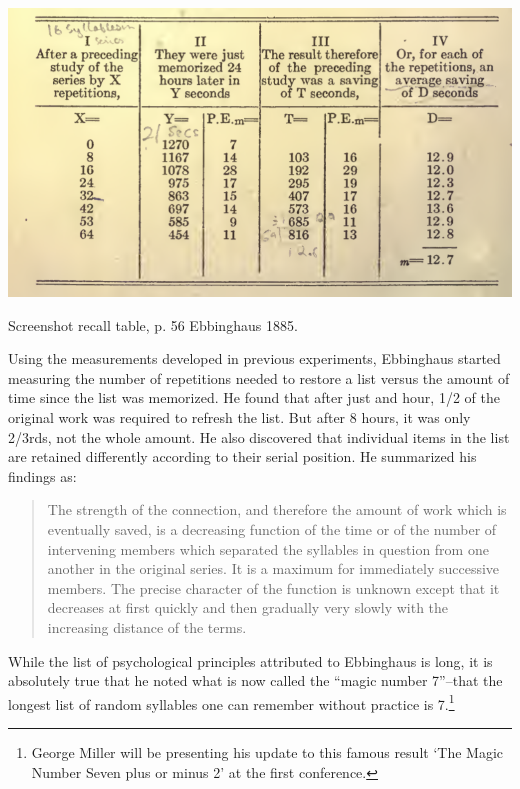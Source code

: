 \begin{refsection}
\begin{marginfigure}
\begin{center}
     \includegraphics[scale=0.5]{../images/ebbinghaus2.png}
\end{center}
 \caption{Screenshot recall table, p. 56 Ebbinghaus 1885.}
\label{fig: ebbinghaus2}
\end{marginfigure}


 Using the measurements developed in previous experiments, Ebbinghaus started measuring the number of repetitions needed to restore a list versus the amount of time since the list was memorized. He found that after just and hour, 1\slash 2 of the original work was required to refresh the list. But after 8 hours, it was only 2\slash 3rds, not the whole amount. He also discovered that individual items in the list are retained differently according to their serial position. He summarized his findings as:

\begin{quote}

The strength of the connection, and therefore the amount of work which is eventually saved, is a decreasing function of the time or of the number of intervening members which separated the syllables in question from one another in the original series. It is a maximum for immediately successive members. The precise character of the function is unknown except that it decreases at first quickly and then gradually very slowly with the increasing distance of the terms. ~\citep[p. 107]{Ebbinghaus:1885ud}
\end{quote}

While the list of psychological principles attributed to Ebbinghaus is long, it is absolutely true that he noted what is now called the ``magic number 7''--that the longest list of random syllables one can remember without practice is 7.\footnote{George Miller will be presenting his update to this famous result `The Magic Number Seven plus or minus 2' at the first conference.} ~\citep[p. 47]{Ebbinghaus:1885ud}


\end{refsection}
